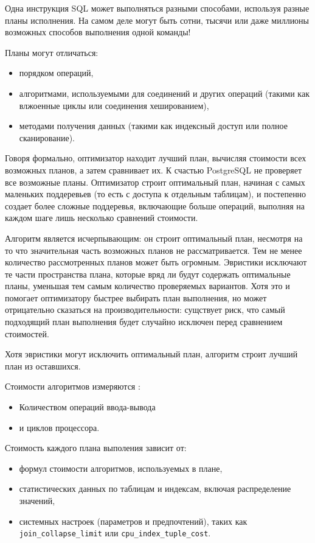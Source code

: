 \documentclass[%
	11pt,
	a4paper,
	utf8,
		]{article}
\begin{document}
Одна инструкция SQL может выполняться разными способами, используя разные планы исполнения. На самом деле могут быть сотни, тысячи или даже миллионы возможных способов выполнения одной команды! 

Планы могут отличаться:

\begin{itemize}
	\item порядком операций,
	
	\item алгоритмами, используемыми для соединений и других операций (такими как влжоенные циклы или соединения хешированием),
	
	\item методами получения данных (такими как индексный доступ или полное сканирование).
\end{itemize}

Говоря формально, оптимизатор находит лучший план, вычисляя стоимости всех возможных планов, а затем сравнивает их. К счастью PostgreSQL не проверяет все возможные планы. Оптимизатор строит оптимальный план, начиная с самых маленьких поддеревьев (то есть с доступа к отдельным таблицам), и постепенно создает более сложные поддеревья, включающие больше операций, выполняя на каждом шаге лишь несколько сравнений стоимости.

Алгоритм является исчерпывающим: он строит оптимальный план, несмотря на то что значительная часть возможных планов не рассматривается. Тем не менее количество рассмотренных планов может быть огромным. Эвристики исключают те части пространства плана, которые вряд ли будут содержать оптимальные планы, уменьшая тем самым количество проверяемых вариантов. Хотя это и помогает оптимизатору быстрее выбирать план выполнения, но может отрицательно сказаться на производительности: сущствует риск, что самый подходящий план выполнения будет случайно исключен перед сравнением стоимостей.

Хотя эвристики могут исключить оптимальный план, алгоритм строит лучший план из оставшихся.

Стоимости алгоритмов измеряются \cite[]{dombrovskaya:postgresql-2022}:
\begin{itemize}
	\item Количеством операций ввода-вывода
	
	\item и циклов процессора.
\end{itemize}

Стоимость каждого плана выполения зависит от:
\begin{itemize}
	\item формул стоимости алгоритмов, используемых в плане,
	
	\item статистических данных по таблицам и индексам, включая распределение значений,
	
	\item системных настроек (параметров и предпочтений), таких как 
	\verb|join_collapse_limit| или \verb|cpu_index_tuple_cost|.
\end{itemize}
\end{document}
